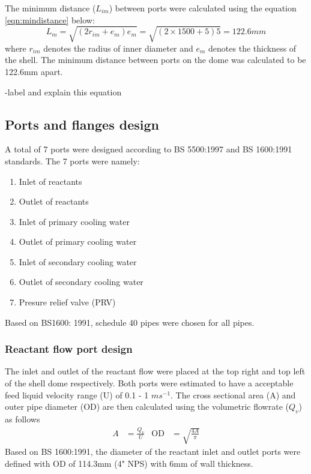 The minimum distance ($L_{im}$) between ports were calculated using the equation \ref{eqn:mindistance} below:
\begin{equation}
    L_m = \sqrt{(2r_{im}+e_{m})e_m} = \sqrt{(2 \times 1500 + 5)5} = 122.6mm
    \label{eqn:mindistance}
\end{equation}
where $r_{im}$ denotes the radius of inner diameter and $e_m$ denotes the thickness of the shell. The minimum distance between ports on the dome was calculated to be 122.6mm apart. 

-label and explain this equation
\subsection{Ports and flanges design}
A total of 7 ports were designed according to BS 5500:1997 and BS 1600:1991 standards. The 7 ports were namely:
\begin{enumerate}
    \item Inlet of reactants
    \item Outlet of reactants
    \item Inlet of primary cooling water
    \item Outlet of primary cooling water
    \item Inlet of secondary cooling water
    \item Outlet of secondary cooling water
    \item Presure relief valve (PRV)
\end{enumerate}
Based on BS1600: 1991, schedule 40 pipes were chosen for all pipes. 
\subsubsection{Reactant flow port design}
The inlet and outlet of the reactant flow were placed at the top right and top left of the shell dome respectively. Both ports were estimated to have a acceptable feed liquid velocity range (U) of 0.1 - 1 $ms^{-1}$. The cross sectional area (A) and outer pipe diameter (OD) are then calculated using the volumetric flowrate ($Q_v$) as follows
\begin{align}
    A &= \frac{Q_v}{U} &
    \mathrm{OD} &= \sqrt{\frac{4A}{\pi}}
\end{align}
Based on BS 1600:1991, the diameter of the reactant inlet and outlet ports were defined with OD of 114.3mm (4" NPS) with 6mm of wall thickness. 

